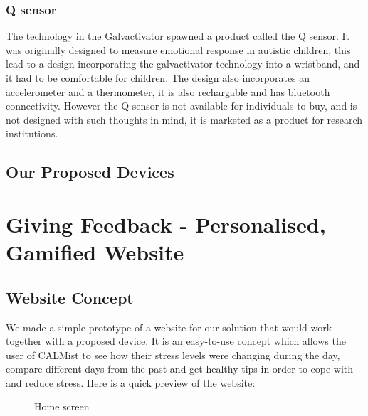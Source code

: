 \documentclass{scrartcl}
\begin{document}
\subsubsection{Q sensor}
The technology in the Galvactivator spawned a product called the Q sensor. It was originally 
designed to measure emotional response in autistic children, this lead to a design incorporating
the galvactivator technology into a wristband, and it had to be comfortable for children. The
design also incorporates an accelerometer and a thermometer, it is also rechargable and has
bluetooth connectivity. However the Q sensor is not available for individuals to buy, and is
not designed with such thoughts in mind, it is marketed as a product for research institutions.

\subsection{Our Proposed Devices}

\section{Giving Feedback - Personalised, Gamified Website}

\subsection{Website Concept}

We made a simple prototype of a website for our solution that would work together with a proposed device. It is an easy-to-use concept which allows the user of CALMist to see how their stress levels were changing during the day, compare different days from the past and get healthy tips in order to cope with and reduce stress. Here is a quick preview of the website:

\begin{figure}[htb]
	\begin{center}
			\end{center}
	\caption{Home screen}
	\label{fig:website-index}
\end{figure}
\end{document}
